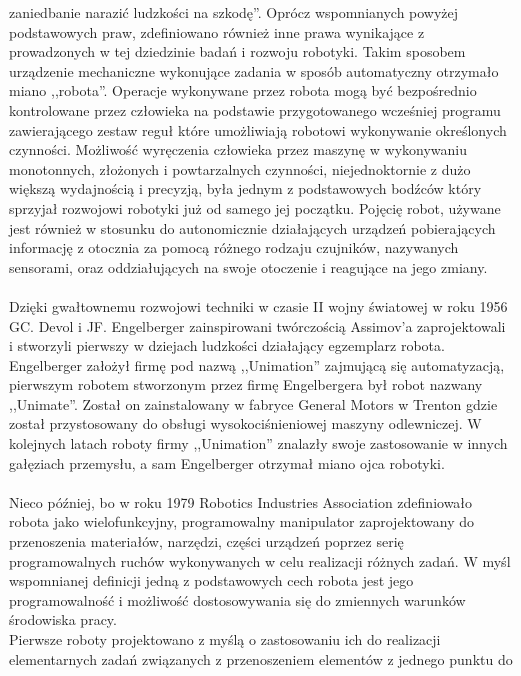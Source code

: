 zaniedbanie narazić ludzkości na szkodę''\cite{website:robotyka-pl}. Oprócz
wspomnianych powyżej podstawowych praw, zdefiniowano również inne prawa
wynikające z prowadzonych w tej dziedzinie badań i rozwoju robotyki.
\newpage
Takim sposobem urządzenie mechaniczne wykonujące zadania w sposób automatyczny
otrzymało miano ,,robota''.\cite{website:asimo-pl} Operacje wykonywane przez
robota mogą być bezpośrednio kontrolowane przez człowieka na podstawie przygotowanego wcześniej
programu zawierającego zestaw reguł które umożliwiają robotowi wykonywanie
określonych czynności. Możliwość wyręczenia człowieka przez maszynę w
wykonywaniu monotonnych, złożonych i powtarzalnych czynności, niejednoktornie
z dużo większą wydajnością i precyzją, była jednym z podstawowych bodźców
który sprzyjał rozwojowi robotyki już od samego jej początku. Pojęcię robot,
używane jest również w stosunku do autonomicznie działających urządzeń
pobierających informację z otocznia za pomocą różnego rodzaju czujników,
nazywanych sensorami, oraz oddziałujących na swoje otoczenie i reagujące na
jego zmiany. \\
\\
Dzięki gwałtownemu rozwojowi techniki w czasie II wojny światowej w roku 1956
GC. Devol i JF. Engelberger zainspirowani twórczością Assimov'a zaprojektowali i
stworzyli pierwszy w dziejach ludzkości działający egzemplarz robota\cite{website:robotyka-pl}.
Engelberger założył firmę pod nazwą ,,Unimation'' zajmującą się automatyzacją,
pierwszym robotem stworzonym przez firmę Engelbergera był robot nazwany
,,Unimate''. Został on zainstalowany w fabryce General Motors w Trenton gdzie
został przystosowany do obsługi wysokociśnieniowej maszyny odlewniczej. W
kolejnych latach roboty firmy ,,Unimation'' znalazły swoje zastosowanie w innych
gałęziach przemysłu, a sam Engelberger otrzymał miano ojca
robotyki.\cite{website:robotyka-pl}\\
\\
Nieco później, bo w roku 1979 Robotics Industries Association 
zdefiniowało robota jako wielofunkcyjny, programowalny manipulator
zaprojektowany do przenoszenia materiałów, narzędzi, części urządzeń poprzez
serię programowalnych ruchów wykonywanych w celu realizacji różnych zadań.
W myśl wspomnianej definicji jedną z podstawowych cech robota jest jego
programowalność i możliwość dostosowywania się do zmiennych warunków środowiska
pracy. \\
Pierwsze roboty projektowano z myślą o zastosowaniu ich do realizacji
elementarnych zadań związanych z przenoszeniem elementów z jednego punktu do
